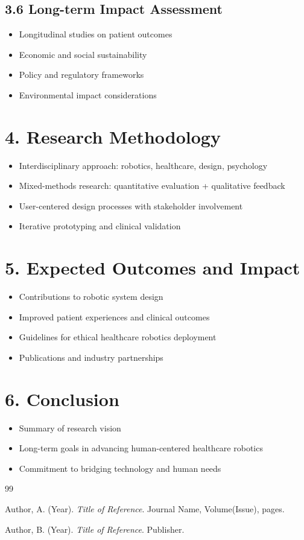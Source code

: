 \documentclass[11pt, a4paper]{article}
\begin{document}
\subsection*{3.6 Long-term Impact Assessment}
\begin{itemize}
    \item Longitudinal studies on patient outcomes
    \item Economic and social sustainability
    \item Policy and regulatory frameworks
    \item Environmental impact considerations
\end{itemize}

\section*{4. Research Methodology}
\begin{itemize}
    \item Interdisciplinary approach: robotics, healthcare, design, psychology
    \item Mixed-methods research: quantitative evaluation + qualitative feedback
    \item User-centered design processes with stakeholder involvement
    \item Iterative prototyping and clinical validation
\end{itemize}

\section*{5. Expected Outcomes and Impact}
\begin{itemize}
    \item Contributions to robotic system design
    \item Improved patient experiences and clinical outcomes
    \item Guidelines for ethical healthcare robotics deployment
    \item Publications and industry partnerships
\end{itemize}

\section*{6. Conclusion}
\begin{itemize}
    \item Summary of research vision
    \item Long-term goals in advancing human-centered healthcare robotics
    \item Commitment to bridging technology and human needs
\end{itemize}

\newpage
\begin{thebibliography}{99}

 Author, A. (Year). \textit{Title of Reference}. Journal Name, Volume(Issue), pages.

 Author, B. (Year). \textit{Title of Reference}. Publisher.

\end{thebibliography}
\end{document}
